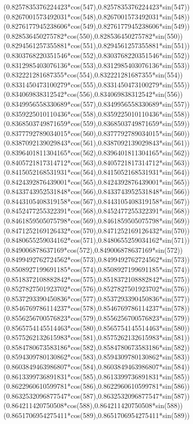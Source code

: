 {({0.8257835376224423*cos(547)},{0.8257835376224423*sin(547)})
({0.8267001573492031*cos(548)},{0.8267001573492031*sin(548)})
({0.8276177945238606*cos(549)},{0.8276177945238606*sin(549)})
({0.828536450275782*cos(550)},{0.828536450275782*sin(550)})
({0.8294561257355881*cos(551)},{0.8294561257355881*sin(551)})
({0.8303768220351546*cos(552)},{0.8303768220351546*sin(552)})
({0.8312985403076136*cos(553)},{0.8312985403076136*sin(553)})
({0.832221281687355*cos(554)},{0.832221281687355*sin(554)})
({0.8331450473100279*cos(555)},{0.8331450473100279*sin(555)})
({0.834069838312542*cos(556)},{0.834069838312542*sin(556)})
({0.8349956558330689*cos(557)},{0.8349956558330689*sin(557)})
({0.8359225010110436*cos(558)},{0.8359225010110436*sin(558)})
({0.8368503749871659*cos(559)},{0.8368503749871659*sin(559)})
({0.8377792789034015*cos(560)},{0.8377792789034015*sin(560)})
({0.8387092139029843*cos(561)},{0.8387092139029843*sin(561)})
({0.8396401811304165*cos(562)},{0.8396401811304165*sin(562)})
({0.8405721817314712*cos(563)},{0.8405721817314712*sin(563)})
({0.8415052168531931*cos(564)},{0.8415052168531931*sin(564)})
({0.8424392876439001*cos(565)},{0.8424392876439001*sin(565)})
({0.8433743952531848*cos(566)},{0.8433743952531848*sin(566)})
({0.8443105408319158*cos(567)},{0.8443105408319158*sin(567)})
({0.8452477255322391*cos(568)},{0.8452477255322391*sin(568)})
({0.8461859505075798*cos(569)},{0.8461859505075798*sin(569)})
({0.8471252169126432*cos(570)},{0.8471252169126432*sin(570)})
({0.8480655259034162*cos(571)},{0.8480655259034162*sin(571)})
({0.849006878637169*cos(572)},{0.849006878637169*sin(572)})
({0.8499492762724562*cos(573)},{0.8499492762724562*sin(573)})
({0.8508927199691185*cos(574)},{0.8508927199691185*sin(574)})
({0.8518372108882842*cos(575)},{0.8518372108882842*sin(575)})
({0.8527827501923702*cos(576)},{0.8527827501923702*sin(576)})
({0.8537293390450836*cos(577)},{0.8537293390450836*sin(577)})
({0.8546769786114237*cos(578)},{0.8546769786114237*sin(578)})
({0.8556256700576823*cos(579)},{0.8556256700576823*sin(579)})
({0.8565754145514463*cos(580)},{0.8565754145514463*sin(580)})
({0.8575262132615983*cos(581)},{0.8575262132615983*sin(581)})
({0.8584780673583186*cos(582)},{0.8584780673583186*sin(582)})
({0.8594309780130862*cos(583)},{0.8594309780130862*sin(583)})
({0.8603849463986807*cos(584)},{0.8603849463986807*sin(584)})
({0.8613399736891831*cos(585)},{0.8613399736891831*sin(585)})
({0.8622960610599781*cos(586)},{0.8622960610599781*sin(586)})
({0.8632532096877547*cos(587)},{0.8632532096877547*sin(587)})
({0.864211420750508*cos(588)},{0.864211420750508*sin(588)})
({0.8651706954275411*cos(589)},{0.8651706954275411*sin(589)})
}
